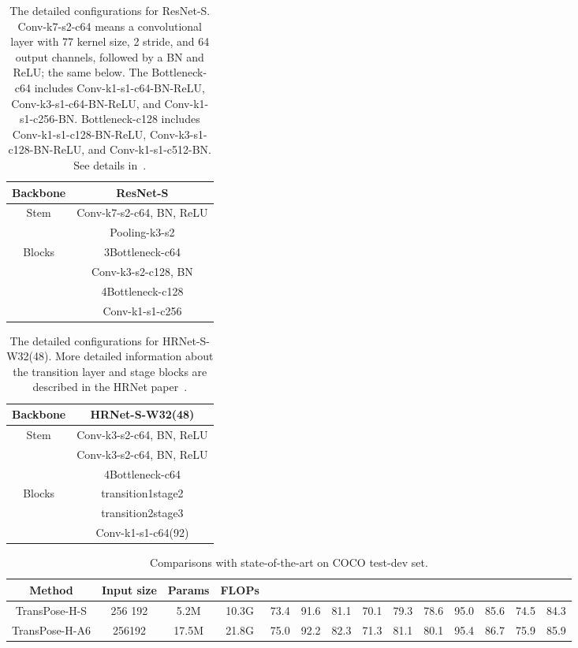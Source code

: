 \documentclass{article}
\begin{document}
\begin{table}
\renewcommand{\arraystretch}{0.9}
\centering

\begin{tabular}{c|c}
	\toprule[0.1em]
	
	Backbone &ResNet-S\\
	\midrule \multirow{2}{*}{Stem}&Conv-k7-s2-c64, BN, ReLU\\
	&Pooling-k3-s2\\
	\hline
	\multirow{4}{*}{Blocks}& 3Bottleneck-c64\\
	&  Conv-k3-s2-c128, BN \\
	&  4Bottleneck-c128\\
	& Conv-k1-s1-c256 \\
	
	\bottomrule[0.1em]
\end{tabular}
\caption{The detailed configurations for ResNet-S. Conv-k7-s2-c64 means a convolutional layer with 77 kernel size, 2 stride, and 64 output channels, followed by a BN and ReLU; the same below. The Bottleneck-c64 includes Conv-k1-s1-c64-BN-ReLU, Conv-k3-s1-c64-BN-ReLU, and Conv-k1-s1-c256-BN. Bottleneck-c128 includes Conv-k1-s1-c128-BN-ReLU, Conv-k3-s1-c128-BN-ReLU, and Conv-k1-s1-c512-BN. See details in~\cite{he2016deep}.}
\label{resnet}
\end{table}

\begin{table}
\renewcommand{\arraystretch}{0.9}
\centering
\begin{tabular}{c|c}
	\toprule[0.1em]
	
	Backbone &HRNet-S-W32(48)\\
	\midrule \multirow{3}{*}{Stem}&Conv-k3-s2-c64, BN, ReLU\\
	&Conv-k3-s2-c64, BN, ReLU\\
	&4Bottleneck-c64\\
	\hline
	\multirow{3}{*}{Blocks}& transition1stage2\\
	&  transition2stage3 \\
	& Conv-k1-s1-c64(92) \\
	
	\bottomrule[0.1em]
\end{tabular}
\caption{The detailed configurations for HRNet-S-W32(48). More detailed information about the transition layer and stage blocks are described in the HRNet paper~\cite{sun2019hrnet}.}
\label{hrnet}
\end{table}
\begin{table*}\scriptsize
\centering
\renewcommand{\arraystretch}{1}
\setlength{\tabcolsep}{0.5mm}
\begin{tabular}{c|c|cc|ccccc|ccccc}
	\toprule
	Method & Input size & Params & FLOPs& 
	 &  &  &  &  & &  &  &  & \\
	\midrule
	TransPose-H-S & 256 192 &5.2M&10.3G& 73.4&91.6&81.1&70.1&79.3&78.6&95.0&85.6&74.5&84.3\\
	TransPose-H-A6 & 256192 &17.5M&21.8G& 75.0&92.2&82.3&71.3&81.1&80.1&95.4&86.7&75.9&85.9\\
	\bottomrule
\end{tabular}
\caption{Comparisons with state-of-the-art on COCO test-dev set.}
\label{appendix::coco-test}
\end{table*}
\end{document}
